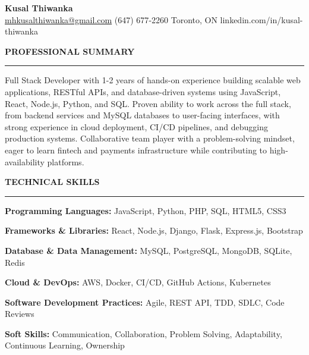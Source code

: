 \documentclass[10pt,letterpaper]{article}
\begin{document}
\begin{center}
{\LARGE\textbf{Kusal Thiwanka}}\\[3pt]
\href{mailto:mhkusalthiwanka@gmail.com}{mhkusalthiwanka@gmail.com}\hspace{2em}%
(647) 677{-}2260\hspace{2em}%
Toronto, ON\hspace{2em}
linkedin.com/in/kusal-thiwanka
\end{center}

\vspace{6pt}

\textbf{PROFESSIONAL SUMMARY}\\[-8pt]
\noindent\rule{\textwidth}{1pt}

\vspace{-2pt}

Full Stack Developer with 1-2 years of hands-on experience building scalable web applications, RESTful APIs, and database-driven systems using JavaScript, React, Node.js, Python, and SQL. Proven ability to work across the full stack, from backend services and MySQL databases to user-facing interfaces, with strong experience in cloud deployment, CI/CD pipelines, and debugging production systems. Collaborative team player with a problem-solving mindset, eager to learn fintech and payments infrastructure while contributing to high-availability platforms.

\vspace{8pt}

\textbf{TECHNICAL SKILLS}\\[-8pt]
\noindent\rule{\textwidth}{1pt}

\vspace{-2pt}

\textbf{Programming Languages:} JavaScript, Python, PHP, SQL, HTML5, CSS3

\textbf{Frameworks \& Libraries:} React, Node.js, Django, Flask, Express.js, Bootstrap

\textbf{Database \& Data Management:} MySQL, PostgreSQL, MongoDB, SQLite, Redis

\textbf{Cloud \& DevOps:} AWS, Docker, CI/CD, GitHub Actions, Kubernetes

\textbf{Software Development Practices:} Agile, REST API, TDD, SDLC, Code Reviews

\textbf{Soft Skills:} Communication, Collaboration, Problem Solving, Adaptability, Continuous Learning, Ownership

\vspace{8pt}
\end{document}
